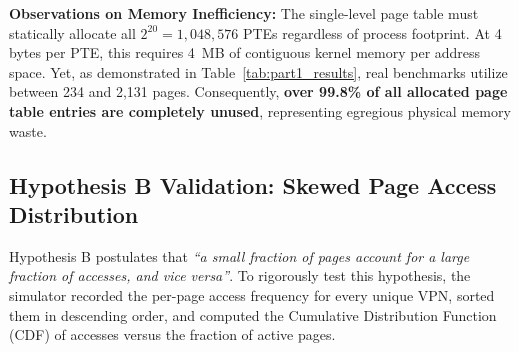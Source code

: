 \documentclass[11pt,a4paper]{article}
\begin{document}
\noindent\textbf{Observations on Memory Inefficiency:}
The single-level page table must statically allocate all $2^{20} = 1,048,576$ PTEs regardless of process footprint. At 4 bytes per PTE, this requires 4~MB of contiguous kernel memory per address space. Yet, as demonstrated in Table~\ref{tab:part1_results}, real benchmarks utilize between 234 and 2,131 pages. Consequently, \textbf{over 99.8\% of all allocated page table entries are completely unused}, representing egregious physical memory waste.

\subsection{Hypothesis B Validation: Skewed Page Access Distribution}
\label{sec:hypothesis_b}
Hypothesis B postulates that \emph{``a small fraction of pages account for a large fraction of accesses, and vice versa''}. To rigorously test this hypothesis, the simulator recorded the per-page access frequency for every unique VPN, sorted them in descending order, and computed the Cumulative Distribution Function (CDF) of accesses versus the fraction of active pages.
\end{document}

